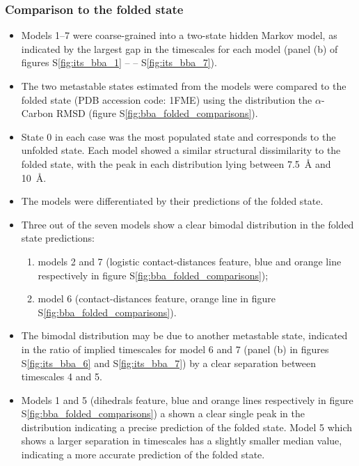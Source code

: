 \documentclass[journal=jacsat,manuscript=article]{achemso}
\newcommand*\sref[1]{%
    S\ref{#1}}
\begin{document}
\subsubsection{Comparison to the folded state}

\begin{itemize}
    \item Models \numrange{1}{7} were coarse-grained into a two-state hidden Markov model, as indicated by the largest gap in the timescales for each model (panel (b)  of figures \sref{fig:its_bba_1} --  -- \sref{fig:its_bba_7}).
    \item The two metastable states estimated from the models were compared to the folded state (PDB accession code: 1FME) using the distribution the $\alpha$-Carbon RMSD (figure \sref{fig:bba_folded_comparisons}).  
    \item State 0 in each case was the most populated state and corresponds to the unfolded state. Each model showed a similar structural dissimilarity to the folded state, with the peak in each distribution lying between \SI{7.5}{\angstrom} and \SI{10}{\angstrom}.  
    \item The models were differentiated by their predictions of the folded state. 
    \item Three out of the seven models show a clear bimodal distribution in the folded state predictions: 
        \begin{enumerate}
            \item models 2 and 7 (logistic contact-distances feature, blue and orange line respectively in figure \sref{fig:bba_folded_comparisons}); 
            \item model 6  (contact-distances feature, orange line in figure \sref{fig:bba_folded_comparisons}). 
        \end{enumerate}
    \item The bimodal distribution may be due to another metastable state, indicated in the ratio of implied timescales for model 6 and 7 (panel (b) in figures \sref{fig:its_bba_6} and \sref{fig:its_bba_7}) by a clear separation between timescales 4 and 5.  
    \item Models 1 and 5 (dihedrals feature, blue and orange lines respectively in figure \sref{fig:bba_folded_comparisons}) a shown a clear single peak in the distribution indicating a precise prediction of the folded state. Model 5 which shows a larger separation in timescales has a slightly smaller median value, indicating a more accurate prediction of the folded state.  
\end{itemize}
\end{document}
